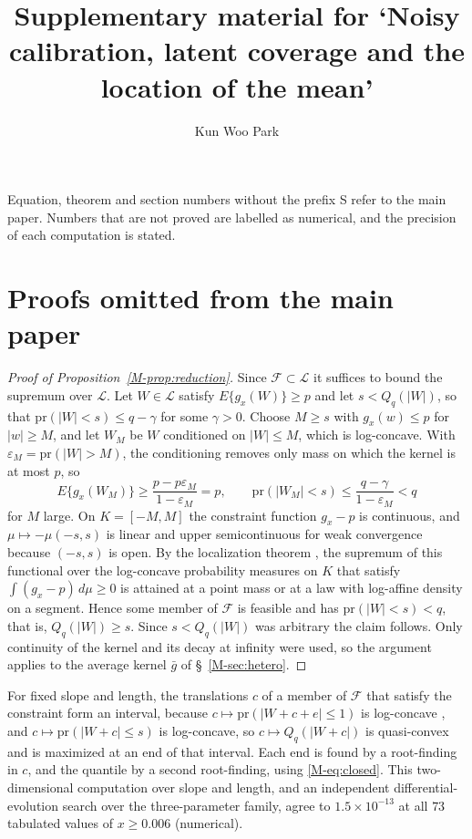 \documentclass[11pt]{article}
\title{Supplementary material for `Noisy calibration, latent coverage and the location of the mean'}
\author{Kun Woo Park}
\date{}
\newcommand{\pr}{\mathrm{pr}}
\newcommand{\LC}{\mathcal{L}}
\begin{document}
\maketitle

\noindent Equation, theorem and section numbers without the prefix S refer to the main paper. Numbers that are not proved are labelled as numerical, and the precision of each computation is stated.

\section{Proofs omitted from the main paper}\label{sec:s-proofs}

\begin{proof}[Proof of Proposition~\ref{M-prop:reduction}]
Since $\mathcal F \subset \LC$ it suffices to bound the supremum over $\LC$. Let $W \in \LC$ satisfy $E\{g_x(W)\} \ge p$ and let $s < Q_q(|W|)$, so that $\pr(|W| < s) \le q - \gamma$ for some $\gamma > 0$. Choose $M \ge s$ with $g_x(w) \le p$ for $|w| \ge M$, and let $W_M$ be $W$ conditioned on $|W| \le M$, which is log-concave. With $\varepsilon_M = \pr(|W| > M)$, the conditioning removes only mass on which the kernel is at most $p$, so
\[
E\{g_x(W_M)\} \ge \frac{p - p\varepsilon_M}{1 - \varepsilon_M} = p, \qquad \pr(|W_M| < s) \le \frac{q - \gamma}{1-\varepsilon_M} < q
\]
for $M$ large. On $K = [-M, M]$ the constraint function $g_x - p$ is continuous, and $\mu \mapsto -\mu(-s, s)$ is linear and upper semicontinuous for weak convergence because $(-s,s)$ is open. By the localization theorem \citep{kannan1995, fradelizi2004}, the supremum of this functional over the log-concave probability measures on $K$ that satisfy $\int(g_x - p)\,d\mu \ge 0$ is attained at a point mass or at a law with log-affine density on a segment. Hence some member of $\mathcal F$ is feasible and has $\pr(|W| < s) < q$, that is, $Q_q(|W|) \ge s$. Since $s < Q_q(|W|)$ was arbitrary the claim follows. Only continuity of the kernel and its decay at infinity were used, so the argument applies to the average kernel $\bar g$ of \S~\ref{M-sec:hetero}.
\end{proof}

For fixed slope and length, the translations $c$ of a member of $\mathcal F$ that satisfy the constraint form an interval, because $c \mapsto \pr(|W + c + e| \le 1)$ is log-concave \citep{prekopa1973}, and $c \mapsto \pr(|W + c| \le s)$ is log-concave, so $c \mapsto Q_q(|W + c|)$ is quasi-convex and is maximized at an end of that interval. Each end is found by a root-finding in $c$, and the quantile by a second root-finding, using \eqref{M-eq:closed}. This two-dimensional computation over slope and length, and an independent differential-evolution search over the three-parameter family, agree to $1.5\times10^{-13}$ at all $73$ tabulated values of $x \ge 0.006$ (numerical).
\end{document}
